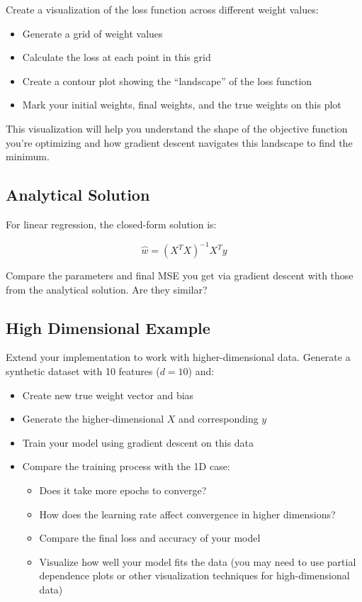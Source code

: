 \documentclass{article}
\begin{document}
Create a visualization of the loss function across different weight values:
\begin{itemize}
    \item Generate a grid of weight values
    \item Calculate the loss at each point in this grid
    \item Create a contour plot showing the ``landscape'' of the loss function
    \item Mark your initial weights, final weights, and the true weights on this plot
\end{itemize}

This visualization will help you understand the shape of the objective function you're optimizing and how gradient descent navigates this landscape to find the minimum.

\subsection{Analytical Solution}

For linear regression, the closed-form solution is:

\[
\hat{w} = (X^T X)^{-1} X^T y
\]

Compare the parameters and final MSE you get via gradient descent with those from the analytical solution. Are they similar?

\subsection{High Dimensional Example}

Extend your implementation to work with higher-dimensional data. Generate a synthetic dataset with 10 features (\( d=10 \)) and:
\begin{itemize}
    \item Create new true weight vector and bias
    \item Generate the higher-dimensional \( X \) and corresponding \( y \)
    \item Train your model using gradient descent on this data
    \item Compare the training process with the 1D case:
    \begin{itemize}
        \item Does it take more epochs to converge?
        \item How does the learning rate affect convergence in higher dimensions?
        \item Compare the final loss and accuracy of your model
        \item Visualize how well your model fits the data (you may need to use partial dependence plots or other visualization techniques for high-dimensional data)
    \end{itemize}
\end{itemize}
\end{document}
